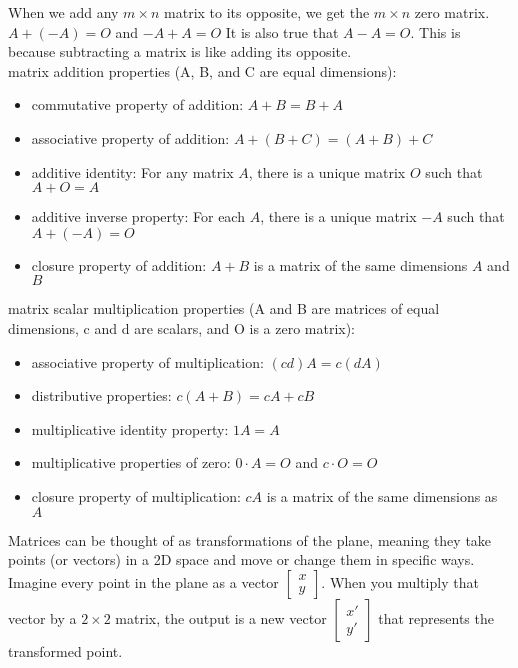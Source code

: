 \documentclass{article}
\begin{document}
When we add any $m \times n$ matrix to its opposite, we get the $m \times n$ zero matrix. $A + (-A) = O$ and $-A + A = O$ It is also true that $A - A = O$. This is because subtracting a matrix is like adding its opposite.\\

matrix addition properties (A, B, and C are equal dimensions):
	\begin{itemize}
		\item commutative property of addition: $A + B = B + A$
		\item associative property of addition: $A + (B + C) = (A + B) + C$
		\item additive identity: For any matrix $A$, there is a unique matrix $O$ such that $A + O = A$
		\item additive inverse property: For each $A$, there is a unique matrix $-A$ such that $A + (-A) = O$
		\item closure property of addition: $A + B$ is a matrix of the same dimensions $A$ and $B$
	\end{itemize}

matrix scalar multiplication properties (A and B are matrices of equal dimensions, c and d are scalars, and O is a zero matrix):
	\begin{itemize}
		\item associative property of multiplication: $(cd)A = c(dA)$
		\item distributive properties: $c(A + B) = cA + cB$
		\item multiplicative identity property: $1A = A$
		\item multiplicative properties of zero: $0 \cdot A = O$ and $c \cdot O = O$
		\item closure property of multiplication: $cA$ is a matrix of the same dimensions as $A$
	\end{itemize}

Matrices can be thought of as transformations of the plane, meaning they take points (or vectors) in a 2D space and move or change them in specific ways. Imagine every point in the plane as a vector $
\begin{bmatrix}
x\\
y
\end{bmatrix}
$. When you multiply that vector by a $2 \times 2$ matrix, the output is a new vector $
\begin{bmatrix}
x'\\
y'
\end{bmatrix}$ that represents the transformed point.\\
\end{document}
